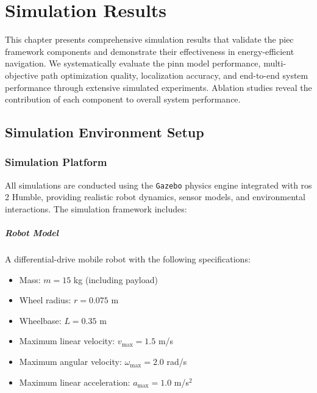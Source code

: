 \chapter{Simulation Results}
\label{ch:simulation_results}

This chapter presents comprehensive simulation results that validate the \acrfull{piec} framework components and demonstrate their effectiveness in energy-efficient navigation. We systematically evaluate the \acrfull{pinn} model performance, multi-objective path optimization quality, localization accuracy, and end-to-end system performance through extensive simulated experiments. Ablation studies reveal the contribution of each component to overall system performance.

\section{Simulation Environment Setup}
\label{sec:sim_environment}

\subsection{Simulation Platform}

All simulations are conducted using the \texttt{Gazebo} physics engine integrated with \acrshort{ros} 2 Humble, providing realistic robot dynamics, sensor models, and environmental interactions. The simulation framework includes:

\paragraph{Robot Model}
A differential-drive mobile robot with the following specifications:
\begin{itemize}
    \item Mass: $m = 15$ kg (including payload)
    \item Wheel radius: $r = 0.075$ m
    \item Wheelbase: $L = 0.35$ m
    \item Maximum linear velocity: $v_{\max} = 1.5$ m/s
    \item Maximum angular velocity: $\omega_{\max} = 2.0$ rad/s
    \item Maximum linear acceleration: $a_{\max} = 1.0$ m/s$^2$
\end{itemize}

